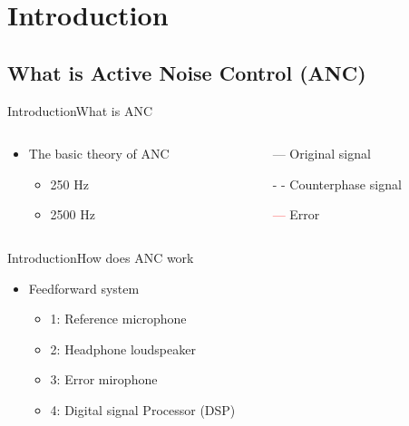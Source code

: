 \section{Introduction}
\subsection{What is Active Noise Control (ANC)}
\begin{frame}{Introduction}{What is ANC}		
	\begin{columns}
		\begin{column}{0.5\textwidth}
				\begin{itemize}
					\item The basic theory of ANC
					\begin{itemize}
						\item 250 Hz
						\item 2500 Hz 
					\end{itemize}	
				\end{itemize}
			\vspace{-2.5mm}	
		\begin{center}
	 		
	 	\end{center}
		\end{column}
		\begin{column}{0.5\textwidth} 
			\begin{itemize}
				\item[\textcolor{MATLABblue}{---}] Original signal
				\item[\textcolor{MATLABblue}{- -}] Counterphase signal
				\item[\textcolor{red}{---}] Error
			\end{itemize}
		\begin{center}
	 		
	 	\end{center}
		\end{column}
	\end{columns}
\end{frame}





\begin{frame}{Introduction}{How does ANC work}		
	\begin{itemize}
		\item Feedforward system
		\begin{itemize}
			\item 1: Reference microphone
			\item 2: Headphone loudspeaker
			\item 3: Error mirophone
			\item 4: Digital signal Processor (DSP)
		\end{itemize}
	\end{itemize}
	\begin{center}
	 	
	\end{center}
\end{frame}



